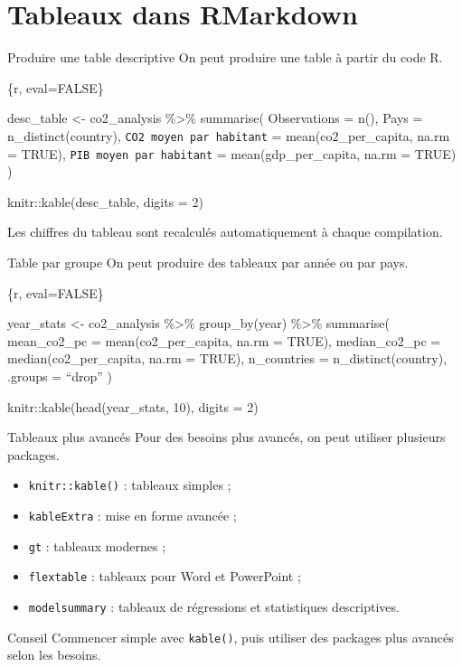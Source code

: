 \documentclass[
  10pt,
  ignorenonframetext,
]{beamer}
\begin{document}
\section{Tableaux dans RMarkdown}\label{tableaux-dans-rmarkdown}

\begin{frame}[fragile]{Produire une table descriptive}
\label{produire-une-table-descriptive}
On peut produire une table à partir du code R.

\{r, eval=FALSE\}

desc\_table \textless- co2\_analysis \%\textgreater\% summarise(
Observations = n(), Pays = n\_distinct(country),
\texttt{CO2\ moyen\ par\ habitant} = mean(co2\_per\_capita, na.rm =
TRUE), \texttt{PIB\ moyen\ par\ habitant} = mean(gdp\_per\_capita, na.rm
= TRUE) )

knitr::kable(desc\_table, digits = 2)

Les chiffres du tableau sont recalculés automatiquement à chaque
compilation.
\end{frame}

\begin{frame}{Table par groupe}
\label{table-par-groupe}
On peut produire des tableaux par année ou par pays.

\{r, eval=FALSE\}

year\_stats \textless- co2\_analysis \%\textgreater\% group\_by(year)
\%\textgreater\% summarise( mean\_co2\_pc = mean(co2\_per\_capita, na.rm
= TRUE), median\_co2\_pc = median(co2\_per\_capita, na.rm = TRUE),
n\_countries = n\_distinct(country), .groups = ``drop'' )

knitr::kable(head(year\_stats, 10), digits = 2)
\end{frame}

\begin{frame}{Tableaux plus avancés}
\label{tableaux-plus-avancuxe9s}
Pour des besoins plus avancés, on peut utiliser plusieurs packages.

\begin{itemize}
  \item \texttt{knitr::kable()} : tableaux simples ;
  \item \texttt{kableExtra} : mise en forme avancée ;
  \item \texttt{gt} : tableaux modernes ;
  \item \texttt{flextable} : tableaux pour Word et PowerPoint ;
  \item \texttt{modelsummary} : tableaux de régressions et statistiques descriptives.
\end{itemize}

\begin{block}{Conseil}
Commencer simple avec \texttt{kable()}, puis utiliser des packages plus avancés selon les besoins.
\end{block}
\end{frame}
\end{document}
